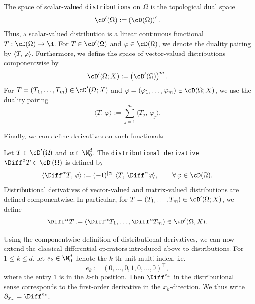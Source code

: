 \begin{definition}[Distributions]
	The space of scalar-valued {\tt distributions} on $\Omega$ is the topological dual space
	\begin{equation*}
		\cD^\prime(\Omega):=\left(\cD(\Omega)\right)^\prime.
	\end{equation*}
	Thus, a scalar-valued distribution is a linear continuous functional $T:\cD(\Omega)\to\R$. For $T\in\cD^\prime(\Omega)$ and $\varphi\in\cD(\Omega)$, we denote the duality pairing by $\langle T,\,\varphi\rangle$. Furthermore, we define the space of vector-valued distributions componentwise by
	\begin{equation*}
		\cD^\prime(\Omega;X):=\left(\cD^\prime(\Omega)\right)^m.
	\end{equation*}
	For $T=(T_1,\ldots,T_m)\in\cD^\prime(\Omega;X)$ and $\varphi=(\varphi_1,\ldots,\varphi_m)\in\cD(\Omega;X)$, we use the duality pairing
	\begin{equation*}
		\langle T,\,\varphi\rangle := \sum_{j=1}^m \langle T_j,\,\varphi_j\rangle.
	\end{equation*}
\end{definition}

Finally, we can define derivatives on such functionals.

\begin{definition}
	Let $T\in\cD^\prime(\Omega)$ and $\alpha\in\N_0^d$. The {\tt distributional derivative} $\Diff^\alpha T\in\cD^\prime(\Omega)$ is defined by
	\begin{equation*}
		\langle \Diff^\alpha T,\,\varphi\rangle
		:=
		(-1)^{|\alpha|}\,\langle T,\,\Diff^\alpha\varphi\rangle,
		\qquad \forall\,\varphi\in\cD(\Omega).
	\end{equation*}
	Distributional derivatives of vector-valued and matrix-valued distributions are defined componentwise.
	In particular, for $T=(T_1,\ldots,T_m)\in\cD^\prime(\Omega;X)$, we define
	\begin{equation*}
		\Diff^\alpha T := (\Diff^\alpha T_1,\ldots,\Diff^\alpha T_m)\in\cD^\prime(\Omega;X).
	\end{equation*}
\end{definition}

Using the componentwise definition of distributional derivatives, we can now extend the classical differential operators introduced above to distributions. For $1\le k\le d$, let $e_k\in\N_0^d$ denote the $k$-th unit multi-index, i.e.
\begin{equation*}
	e_k := (0,\ldots,0,1,0,\ldots,0)^\top,
\end{equation*}
where the entry $1$ is in the $k$-th position. Then $\Diff^{e_k}$ in the distributional sense corresponds to the first-order derivative in the $x_k$-direction. We thus write $\partial_{x_k} = \Diff^{e_k}$.

